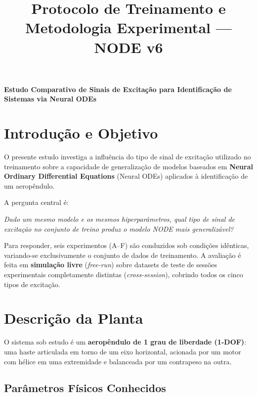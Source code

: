 \documentclass[11pt,a4paper]{article}
\title{Protocolo de Treinamento e Metodologia Experimental — NODE v6}
\author{}
\date{}
\begin{document}
\maketitle

\begin{center}
\Large\textbf{Estudo Comparativo de Sinais de Excitação para Identificação de Sistemas via Neural ODEs}
\end{center}

\vspace{0.5cm}

\section{Introdução e Objetivo}

O presente estudo investiga a influência do tipo de sinal de excitação utilizado no treinamento sobre a capacidade de generalização de modelos baseados em \textbf{Neural Ordinary Differential Equations} (Neural ODEs) aplicados à identificação de um aeropêndulo.

A pergunta central é:

\begin{tcolorbox}
\textit{Dado um mesmo modelo e os mesmos hiperparâmetros, qual tipo de sinal de excitação no conjunto de treino produz o modelo NODE mais generalizável?}
\end{tcolorbox}

Para responder, seis experimentos (A--F) são conduzidos sob condições idênticas, variando-se exclusivamente o conjunto de dados de treinamento. A avaliação é feita em \textbf{simulação livre} (\textit{free-run}) sobre datasets de teste de sessões experimentais completamente distintas (\textit{cross-session}), cobrindo todos os cinco tipos de excitação.

\section{Descrição da Planta}

O sistema sob estudo é um \textbf{aeropêndulo de 1 grau de liberdade (1-DOF)}: uma haste articulada em torno de um eixo horizontal, acionada por um motor com hélice em uma extremidade e balanceada por um contrapeso na outra.

\subsection{Parâmetros Físicos Conhecidos}
\end{document}
